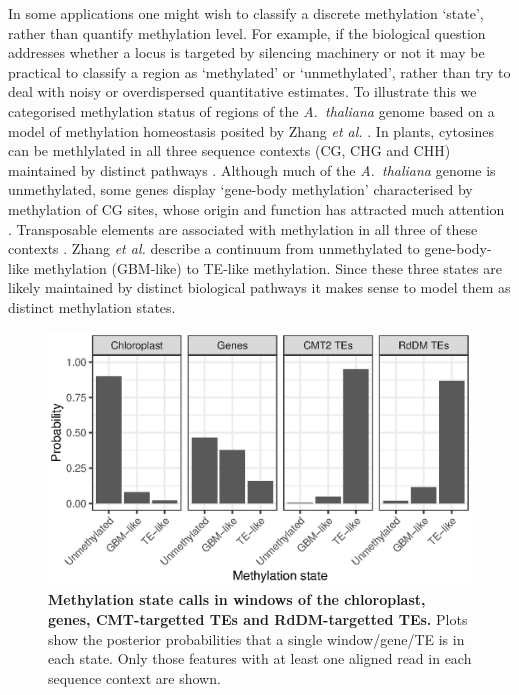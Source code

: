 \documentclass[10pt,letterpaper,draft]{article}
\begin{document}
In some applications one might wish to classify a discrete methylation `state', rather than quantify methylation level.
For example, if the biological question addresses whether a locus is targeted by silencing machinery or not it may be practical to classify a region as `methylated' or `unmethylated', rather than try to deal with noisy or overdispersed quantitative estimates.
To illustrate this we categorised methylation status of regions of the \emph{A.~thaliana} genome based on a model of methylation homeostasis posited by Zhang \textit{et al.} \cite{zhang2020natural}.
In plants, cytosines can be methlylated in all three sequence contexts (CG, CHG and CHH) maintained by distinct pathways \cite{law2010establishing}.
Although much of the \emph{A.~thaliana} genome is unmethylated, some genes display `gene-body methylation' characterised by methylation of CG sites, whose origin and function has attracted much attention \cite{muyle2022gene}. 
Transposable elements are associated with methylation in all three of these contexts \cite{cokus2008shotgun, lister2008highly}.
Zhang \textit{et al.} \cite{zhang2020natural} describe a continuum from unmethylated to gene-body-like methylation (GBM-like) to TE-like methylation.
Since these three states are likely maintained by distinct biological pathways it makes sense to model them as distinct methylation states.

\begin{figure}
    \centering
    \includegraphics{figure4.eps}
    \caption{
        {\bf Methylation state calls in windows of the chloroplast, genes, CMT-targetted TEs and RdDM-targetted TEs.}
        Plots show the posterior probabilities that a single window/gene/TE is in each state.
        Only those features with at least one aligned read in each sequence context are shown.
    }
    \label{fig:meth-state}
\end{figure}
\end{document}
